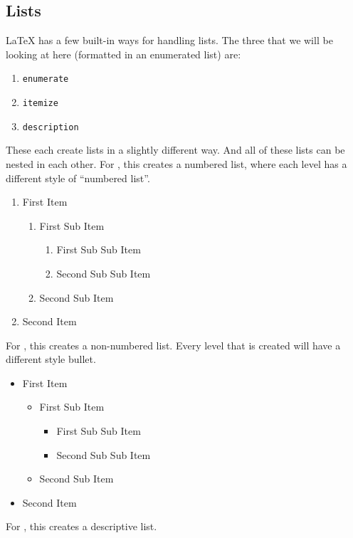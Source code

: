 		\subsection{Lists}
			\LaTeX{} has a few built-in ways for handling lists.
			The three that we will be looking at here (formatted in an enumerated list) are:
			\begin{enumerate}
				\item \lstinline|enumerate|
				\item \lstinline|itemize|
				\item \lstinline|description|
			\end{enumerate}
			These each create lists in a slightly different way.
			And all of these lists can be nested in each other.
			For , this creates a numbered list, where each level has a different style of \enquote{numbered list}.
			\begin{enumerate}
				\item First Item
					\begin{enumerate}
						\item First Sub Item
							\begin{enumerate}
								\item First Sub Sub Item
								\item Second Sub Sub Item
							\end{enumerate}
						\item Second Sub Item
					\end{enumerate}
				\item Second Item
			\end{enumerate}
			For , this creates a non-numbered list.
			Every level that is created will have a different style bullet.
			\begin{itemize}
				\item First Item
					\begin{itemize}
						\item First Sub Item
							\begin{itemize}
								\item First Sub Sub Item
								\item Second Sub Sub Item
							\end{itemize}
						\item Second Sub Item
					\end{itemize}
				\item Second Item
			\end{itemize}
			For , this creates a descriptive list.
